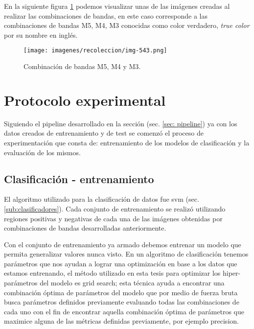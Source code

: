 En la siguiente figura \ref{Fig: bandas543} podemos visualizar unas de las imágenes creadas al realizar las combinaciones de bandas, en este caso corresponde  a las combinaciones de bandas M5, M4, M3 conocidas como color verdadero, \textit{true color} por su nombre en inglés.

\begin{figure}[H]
 \centering
  \texttt{[image: imagenes/recoleccion/img-543.png]}
  \caption{Combinación de bandas M5, M4 y M3.}
	\label{Fig: bandas543}
\end{figure}



\section{Protocolo experimental}\label{sec:entrenamiento}

Siguiendo el pipeline desarrollado en la sección (sec. \ref{sec: pipeline}) ya con los datos creados de entrenamiento y de test se comenzó el proceso de experimentación que consta de: entrenamiento de los modelos de clasificación y la evaluación de los mismos.

\subsection*{Clasificación - entrenamiento}\label{sub:entr_class}

El algoritmo utilizado para la clasificación de datos fue \ac{svm} (sec. \ref{sub:clasificadores}). Cada conjunto de entrenamiento se realizó utilizando regiones positivas y negativas de cada una de las imágenes obtenidas por combinaciones de bandas desarrolladas anteriormente.

Con el conjunto de entrenamiento ya armado debemos entrenar un modelo que permita generalizar valores nunca visto. En un algoritmo  de clasificación tenemos parámetros que nos ayudan a lograr una optimización en base a los datos que estamos entrenando, el método utilizado en esta tesis para optimizar los hiper-parámetros del modelo es grid search; esta técnica ayuda a encontrar una combinación óptima de parámetros del modelo que por medio de fuerza bruta busca parámetros definidos previamente evaluando todas las combinaciones de cada uno con el fin de encontrar aquella combinación óptima de  parámetros que maximice alguna de las métricas definidas previamente, por ejemplo precision. 

